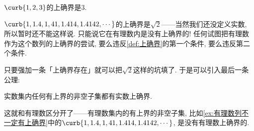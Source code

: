 \documentclass[hidelinks]{ctexart}
\begin{document}
\begin{sample}
    \begin{ex}
        $\curb{1,2,3}$的上确界是$3$.
    \end{ex}
    \begin{ex}
        $\curb{1,1.4,1,41, 1.414, 1.4142, \cdots}$的上确界是$\sqrt{2}$——当然我们还没定义实数, 所以暂时还不能这样说. 只能说它在有理数内是没有上确界的! 任何试图把有理数作为这个数列的上确界的尝试, 要么违反\cref{def:上确界}的第一个条件, 要么违反第二个条件.
    \end{ex}
\end{sample}

只要强加一条「上确界存在」就可以把$\sqrt{2}$这样的坑填了. 于是可以引入最后一条公理:
\begin{finale}
    \begin{axiom}[上确界原理]
        \label{ax:上确界原理}
        实数集内任何有上界的非空子集都有实数上确界.
    \end{axiom}
\end{finale}
这就和有理数区分开了——有理数集内的有上界的非空子集, 比如\cref{ex:有理数列不一定有上确界}中的$\curb{1,1.4,1,41, 1.414, 1.4142, \cdots}$, 是没有有理数上确界的.

\end{document}
